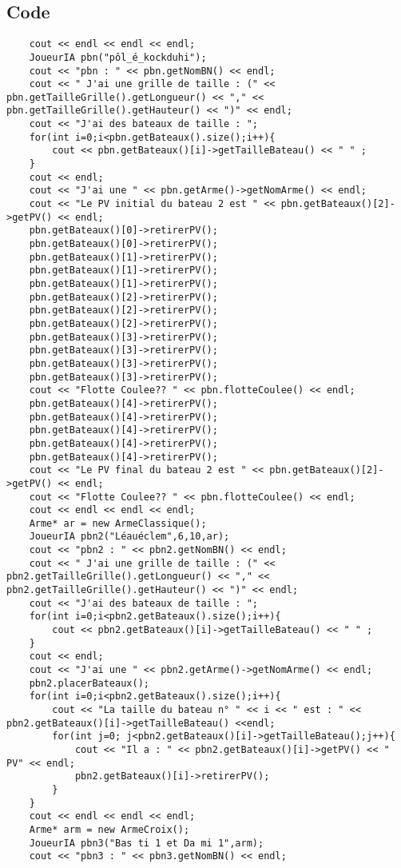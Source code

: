         \subsection{Code}
\begin{lstlisting}
	cout << endl << endl << endl;
	JoueurIA pbn("pôl_é_kockduhi");
	cout << "pbn : " << pbn.getNomBN() << endl;
	cout << " J'ai une grille de taille : (" << pbn.getTailleGrille().getLongueur() << "," << pbn.getTailleGrille().getHauteur() << ")" << endl;
	cout << "J'ai des bateaux de taille : ";
	for(int i=0;i<pbn.getBateaux().size();i++){
		cout << pbn.getBateaux()[i]->getTailleBateau() << " " ;
	}
	cout << endl;
	cout << "J'ai une " << pbn.getArme()->getNomArme() << endl;
	cout << "Le PV initial du bateau 2 est " << pbn.getBateaux()[2]->getPV() << endl;
	pbn.getBateaux()[0]->retirerPV();
	pbn.getBateaux()[0]->retirerPV();
	pbn.getBateaux()[1]->retirerPV();
	pbn.getBateaux()[1]->retirerPV();
	pbn.getBateaux()[1]->retirerPV();
	pbn.getBateaux()[2]->retirerPV();
	pbn.getBateaux()[2]->retirerPV();
	pbn.getBateaux()[2]->retirerPV();
	pbn.getBateaux()[3]->retirerPV();
	pbn.getBateaux()[3]->retirerPV();
	pbn.getBateaux()[3]->retirerPV();
	pbn.getBateaux()[3]->retirerPV();
	cout << "Flotte Coulee?? " << pbn.flotteCoulee() << endl;
	pbn.getBateaux()[4]->retirerPV();
	pbn.getBateaux()[4]->retirerPV();
	pbn.getBateaux()[4]->retirerPV();
	pbn.getBateaux()[4]->retirerPV();
	pbn.getBateaux()[4]->retirerPV();
	cout << "Le PV final du bateau 2 est " << pbn.getBateaux()[2]->getPV() << endl;
	cout << "Flotte Coulee?? " << pbn.flotteCoulee() << endl;
	cout << endl << endl << endl;
	Arme* ar = new ArmeClassique();
	JoueurIA pbn2("Léauéclem",6,10,ar);
	cout << "pbn2 : " << pbn2.getNomBN() << endl;
	cout << " J'ai une grille de taille : (" << pbn2.getTailleGrille().getLongueur() << "," << pbn2.getTailleGrille().getHauteur() << ")" << endl;
	cout << "J'ai des bateaux de taille : ";
	for(int i=0;i<pbn2.getBateaux().size();i++){
		cout << pbn2.getBateaux()[i]->getTailleBateau() << " " ;
	}
	cout << endl;
	cout << "J'ai une " << pbn2.getArme()->getNomArme() << endl;
	pbn2.placerBateaux();
	for(int i=0;i<pbn2.getBateaux().size();i++){
		cout << "La taille du bateau n° " << i << " est : " << pbn2.getBateaux()[i]->getTailleBateau() <<endl;
		for(int j=0; j<pbn2.getBateaux()[i]->getTailleBateau();j++){
			cout << "Il a : " << pbn2.getBateaux()[i]->getPV() << " PV" << endl;
			pbn2.getBateaux()[i]->retirerPV();
		}
	}
	cout << endl << endl << endl;
	Arme* arm = new ArmeCroix();
	JoueurIA pbn3("Bas ti 1 et Da mi 1",arm);
	cout << "pbn3 : " << pbn3.getNomBN() << endl;

\end{lstlisting}
